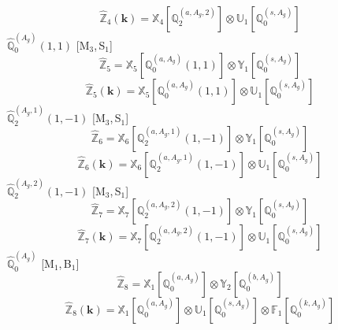 \documentclass[fleqn,10pt,landscape]{article}
\begin{document}
\begin{itemize}
\begin{dmath*}
\hat{\mathbb{Z}}_{4}(\bm{k})=\mathbb{X}_{4}[\mathbb{Q}_{2}^{(a,A_{g},2)}] \otimes\mathbb{U}_{1}[\mathbb{Q}_{0}^{(s,A_{g})}]
\end{dmath*}
\vspace{4mm}
\noindent {} $\,\,\,\hat{\mathbb{Q}}_{0}^{(A_{g})}(1,1)$ [M$_{3}$,\,S$_{1}$]
\begin{dmath*}
\hat{\mathbb{Z}}_{5}=\mathbb{X}_{5}[\mathbb{Q}_{0}^{(a,A_{g})}(1,1)] \otimes\mathbb{Y}_{1}[\mathbb{Q}_{0}^{(s,A_{g})}]
\end{dmath*}
\begin{dmath*}
\hat{\mathbb{Z}}_{5}(\bm{k})=\mathbb{X}_{5}[\mathbb{Q}_{0}^{(a,A_{g})}(1,1)] \otimes\mathbb{U}_{1}[\mathbb{Q}_{0}^{(s,A_{g})}]
\end{dmath*}
\vspace{4mm}
\noindent {} $\,\,\,\hat{\mathbb{Q}}_{2}^{(A_{g},1)}(1,-1)$ [M$_{3}$,\,S$_{1}$]
\begin{dmath*}
\hat{\mathbb{Z}}_{6}=\mathbb{X}_{6}[\mathbb{Q}_{2}^{(a,A_{g},1)}(1,-1)] \otimes\mathbb{Y}_{1}[\mathbb{Q}_{0}^{(s,A_{g})}]
\end{dmath*}
\begin{dmath*}
\hat{\mathbb{Z}}_{6}(\bm{k})=\mathbb{X}_{6}[\mathbb{Q}_{2}^{(a,A_{g},1)}(1,-1)] \otimes\mathbb{U}_{1}[\mathbb{Q}_{0}^{(s,A_{g})}]
\end{dmath*}
\vspace{4mm}
\noindent {} $\,\,\,\hat{\mathbb{Q}}_{2}^{(A_{g},2)}(1,-1)$ [M$_{3}$,\,S$_{1}$]
\begin{dmath*}
\hat{\mathbb{Z}}_{7}=\mathbb{X}_{7}[\mathbb{Q}_{2}^{(a,A_{g},2)}(1,-1)] \otimes\mathbb{Y}_{1}[\mathbb{Q}_{0}^{(s,A_{g})}]
\end{dmath*}
\begin{dmath*}
\hat{\mathbb{Z}}_{7}(\bm{k})=\mathbb{X}_{7}[\mathbb{Q}_{2}^{(a,A_{g},2)}(1,-1)] \otimes\mathbb{U}_{1}[\mathbb{Q}_{0}^{(s,A_{g})}]
\end{dmath*}
\vspace{4mm}
\noindent {} $\,\,\,\hat{\mathbb{Q}}_{0}^{(A_{g})}$ [M$_{1}$,\,B$_{1}$]
\begin{dmath*}
\hat{\mathbb{Z}}_{8}=\mathbb{X}_{1}[\mathbb{Q}_{0}^{(a,A_{g})}] \otimes\mathbb{Y}_{2}[\mathbb{Q}_{0}^{(b,A_{g})}]
\end{dmath*}
\begin{dmath*}
\hat{\mathbb{Z}}_{8}(\bm{k})=\mathbb{X}_{1}[\mathbb{Q}_{0}^{(a,A_{g})}] \otimes\mathbb{U}_{1}[\mathbb{Q}_{0}^{(s,A_{g})}] \otimes\mathbb{F}_{1}[\mathbb{Q}_{0}^{(k,A_{g})}]
\end{dmath*}

\end{itemize}
\end{document}

